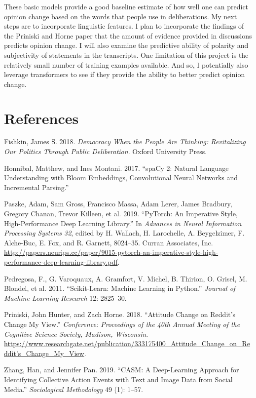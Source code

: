 \documentclass[12pt,]{article}
\begin{document}
These basic models provide a good baseline estimate of how well one can
predict opinion change based on the words that people use in
deliberations. My next steps are to incorporate linguistic features. I
plan to incorporate the findings of the Priniski and Horne paper that
the amount of evidence provided in discussions predicts opinion change.
I will also examine the predictive ability of polarity and subjectivity
of statements in the transcripts. One limitation of this project is the
relatively small number of training examples available. And so, I
potentially also leverage transformers to see if they provide the
ability to better predict opinion change.

\newpage

\hypertarget{references}{%
\section*{References}\label{references}}

\hypertarget{refs}{}
\leavevmode\hypertarget{ref-fishkin}{}%
Fishkin, James S. 2018. \emph{Democracy When the People Are Thinking:
Revitalizing Our Politics Through Public Deliberation}. Oxford
University Press.

\leavevmode\hypertarget{ref-spacy2}{}%
Honnibal, Matthew, and Ines Montani. 2017. ``spaCy 2: Natural Language
Understanding with Bloom Embeddings, Convolutional Neural Networks and
Incremental Parsing.''

\leavevmode\hypertarget{ref-pytorch}{}%
Paszke, Adam, Sam Gross, Francisco Massa, Adam Lerer, James Bradbury,
Gregory Chanan, Trevor Killeen, et al. 2019. ``PyTorch: An Imperative
Style, High-Performance Deep Learning Library.'' In \emph{Advances in
Neural Information Processing Systems 32}, edited by H. Wallach, H.
Larochelle, A. Beygelzimer, F. Alche-Buc, E. Fox, and R. Garnett,
8024--35. Curran Associates, Inc.
\url{http://papers.neurips.cc/paper/9015-pytorch-an-imperative-style-high-performance-deep-learning-library.pdf}.

\leavevmode\hypertarget{ref-scikit-learn}{}%
Pedregosa, F., G. Varoquaux, A. Gramfort, V. Michel, B. Thirion, O.
Grisel, M. Blondel, et al. 2011. ``Scikit-Learn: Machine Learning in
Python.'' \emph{Journal of Machine Learning Research} 12: 2825--30.

\leavevmode\hypertarget{ref-cmv}{}%
Priniski, John Hunter, and Zach Horne. 2018. ``Attitude Change on
Reddit's Change My View.'' \emph{Conference: Proceedings of the 40th
Annual Meeting of the Cognitive Science Society, Madison, Wisconsin}.
\url{https://www.researchgate.net/publication/333175400_Attitude_Change_on_Reddit's_Change_My_View}.

\leavevmode\hypertarget{ref-zhang}{}%
Zhang, Han, and Jennifer Pan. 2019. ``CASM: A Deep-Learning Approach for
Identifying Collective Action Events with Text and Image Data from
Social Media.'' \emph{Sociological Methodology} 49 (1): 1--57.





\newpage
\singlespacing 
\end{document}
